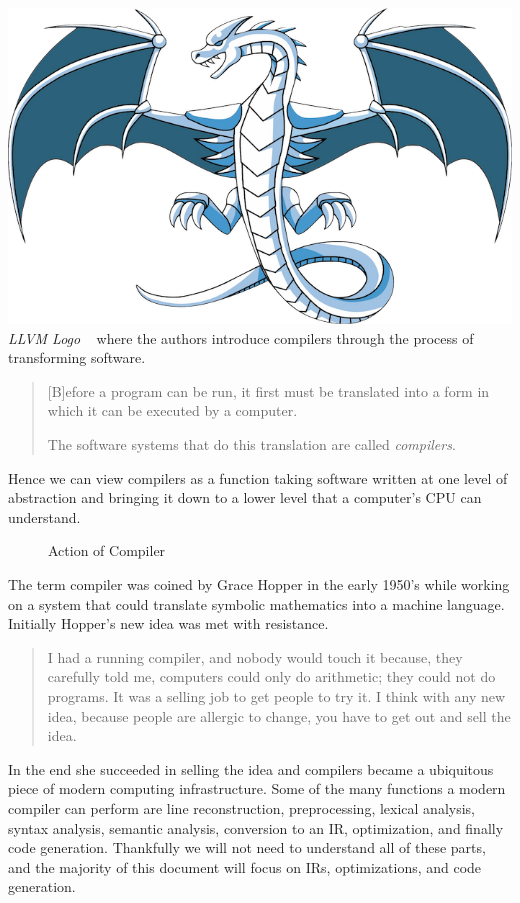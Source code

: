 {    \includegraphics[width=\marginparwidth]{img/llvmlogo.png}
    \emph{LLVM Logo}
}~\cite{dragonbook} where the authors introduce compilers through the process of transforming software.
\begin{quotation}
    [B]efore a program can be run, it first must be translated into a form in which it can be executed by a computer.

    The software systems that do this translation are called \emph{compilers}.
\end{quotation}
Hence we can view compilers as a function taking software written at one level of abstraction and bringing it down to a lower level that a computer's \ac{CPU} can understand.
\begin{figure}[ht]
    \centering
    
    \caption{Action of Compiler}\label{fig:compiler}
\end{figure}

The term compiler was coined by Grace Hopper in the early 1950's while working on a system that could translate symbolic mathematics into a machine language.
Initially Hopper's new idea was met with resistance.
\begin{quotation}
    I had a running compiler, and nobody would touch it because, they carefully told me, computers could only do arithmetic; they could not do programs.
    It was a selling job to get people to try it.
    I think with any new idea, because people are allergic to change, you have to get out and sell the idea.
\end{quotation}
In the end she succeeded in selling the idea and compilers became a ubiquitous piece of modern computing infrastructure.
Some of the many functions a modern compiler can perform are line reconstruction, preprocessing, lexical analysis, syntax analysis, semantic analysis, conversion to an \ac{IR}, optimization, and finally code generation.
Thankfully we will not need to understand all of these parts, and the majority of this document will focus on \aclp{IR}, optimizations, and code generation.

